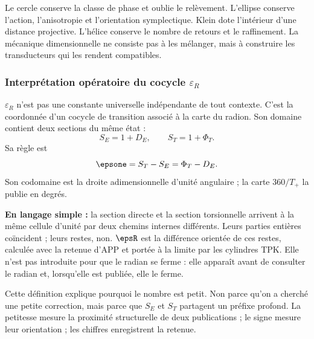 Le cercle conserve la classe de phase et oublie le relèvement. L'ellipse conserve
l'action, l'anisotropie et l'orientation symplectique. Klein dote l'intérieur d'une
distance projective. L'hélice conserve le nombre de retours et le raffinement.
La mécanique dimensionnelle ne consiste pas à les mélanger, mais à construire les
transducteurs qui les rendent compatibles.

\subsubsection{Interprétation opératoire du cocycle \(\varepsilon_R\)}

\(\varepsilon_R\) n'est pas une constante universelle indépendante de tout contexte. C'est la
coordonnée d'un cocycle de transition associé à la carte du radion. Son
domaine contient deux sections du même état :
\[
S_E=1+D_E,
\qquad
S_T=1+\Phi_T.
\]
Sa règle est
\begin{equation}
\epsone=S_T-S_E=\Phi_T-D_E.
\label{eq:epsilon-final-meaning}
\end{equation}
Son codomaine est la droite adimensionnelle d'unité angulaire ; la carte
\(360/T_+\) la publie en degrés.

\begin{exactbox}
\textbf{En langage simple :} la section directe et la section torsionnelle arrivent
à la même cellule d'unité par deux chemins internes différents. Leurs parties
entières coïncident ; leurs restes, non. \(\epsR\) est la différence orientée de ces
restes, calculée avec la retenue d'APP et portée à la limite par les cylindres
TPK. Elle n'est pas introduite pour que le radian se ferme : elle apparaît avant de consulter le
radian et, lorsqu'elle est publiée, elle le ferme.
\end{exactbox}

Cette définition explique pourquoi le nombre est petit. Non parce qu'on a
cherché une petite correction, mais parce que \(S_E\) et \(S_T\) partagent un
préfixe profond. La petitesse mesure la proximité structurelle de deux
publications ; le signe mesure leur orientation ; les chiffres enregistrent la retenue.

